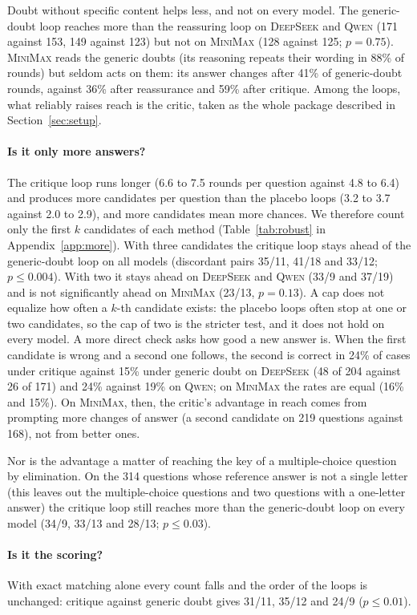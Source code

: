 \documentclass[11pt]{article}
\newcommand{\ds}{\textsc{DeepSeek}}
\newcommand{\qw}{\textsc{Qwen}}
\newcommand{\mm}{\textsc{MiniMax}}
\begin{document}
Doubt without specific content helps less, and not on every model.
The generic-doubt loop reaches more than the reassuring loop on \ds{} and \qw{} (171 against 153, 149 against 123) but not on \mm{} (128 against 125; $p=0.75$).
\mm{} reads the generic doubts (its reasoning repeats their wording in 88\% of rounds) but seldom acts on them: its answer changes after 41\% of generic-doubt rounds, against 36\% after reassurance and 59\% after critique.
Among the loops, what reliably raises reach is the critic, taken as the whole package described in Section~\ref{sec:setup}.

\paragraph{Is it only more answers?}
The critique loop runs longer (6.6 to 7.5 rounds per question against 4.8 to 6.4) and produces more candidates per question than the placebo loops (3.2 to 3.7 against 2.0 to 2.9), and more candidates mean more chances.
We therefore count only the first $k$ candidates of each method (Table~\ref{tab:robust} in Appendix~\ref{app:more}).
With three candidates the critique loop stays ahead of the generic-doubt loop on all models (discordant pairs 35/11, 41/18 and 33/12; $p\le 0.004$).
With two it stays ahead on \ds{} and \qw{} (33/9 and 37/19) and is not significantly ahead on \mm{} (23/13, $p=0.13$).
A cap does not equalize how often a $k$-th candidate exists: the placebo loops often stop at one or two candidates, so the cap of two is the stricter test, and it does not hold on every model.
A more direct check asks how good a new answer is.
When the first candidate is wrong and a second one follows, the second is correct in 24\% of cases under critique against 15\% under generic doubt on \ds{} (48 of 204 against 26 of 171) and 24\% against 19\% on \qw; on \mm{} the rates are equal (16\% and 15\%).
On \mm, then, the critic's advantage in reach comes from prompting more changes of answer (a second candidate on 219 questions against 168), not from better ones.

Nor is the advantage a matter of reaching the key of a multiple-choice question by elimination.
On the 314 questions whose reference answer is not a single letter (this leaves out the multiple-choice questions and two questions with a one-letter answer) the critique loop still reaches more than the generic-doubt loop on every model (34/9, 33/13 and 28/13; $p\le 0.03$).

\paragraph{Is it the scoring?}
With exact matching alone every count falls and the order of the loops is unchanged: critique against generic doubt gives 31/11, 35/12 and 24/9 ($p\le 0.01$).
\end{document}
